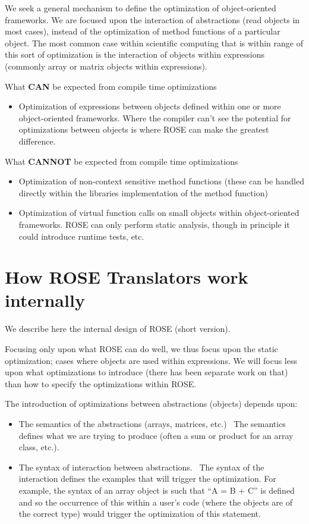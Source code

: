    We seek a general mechanism to define the optimization of object-oriented frameworks.
We are focused upon the interaction of abstractions (read objects in most cases), instead
of the optimization of method functions of a particular object. The most common case within
scientific computing that is within range of this sort of optimization is the interaction
of objects within expressions (commonly array or matrix objects within expressions).

What {\bf CAN} be expected from compile time optimizations
\begin{itemize}
   \item Optimization of expressions between objects defined within one or more 
         object-oriented frameworks. Where the compiler can't see the potential
         for optimizations between objects is where ROSE can make the greatest 
         difference.
\end{itemize}

What {\bf CANNOT} be expected from compile time optimizations
\begin{itemize}
   \item Optimization of non-context sensitive method functions (these can be 
         handled directly within the libraries implementation of the method function)
   \item Optimization of virtual function calls on small objects within
         object-oriented frameworks.  ROSE can only perform static analysis,
         though in principle it could introduce runtime tests, etc.
\end{itemize}

\section{ How ROSE Translators work internally }
   We describe here the internal design of ROSE (short version).

   Focusing only upon what ROSE can do well, we thus focus upon the static
optimization; cases where objects are used within expressions. We will focus less upon
what optimizations to introduce (there has been separate work on that) than how to
specify the optimizations within ROSE.

The introduction of optimizations between abstractions (objects) depends upon:
\begin{itemize}
   \item The semantics of the abstractions (arrays, matrices, etc.) \
         The semantics defines what we are trying to produce (often a sum or product for an array class, etc.).
   \item The syntax of interaction between abstractions. \
         The syntax of the interaction defines the examples that will trigger the optimization.
         For example, the syntax of an array object is such that ``A = B + C'' is defined and so
         the occurrence of this within a user's code (where the objects are of the correct
         type) would trigger the optimization of this statement.
\end{itemize}

